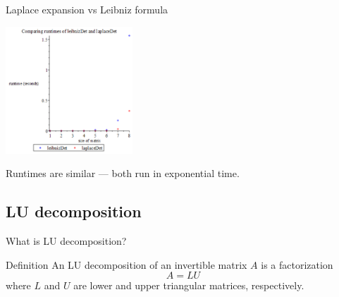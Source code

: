 \documentclass{beamer}
\begin{document}
\begin{frame}{Laplace expansion vs Leibniz formula}

    \begin{center}{}
        \includegraphics[height=180]{leibniz-laplace}
    \end{center}

    Runtimes are similar --- both run in exponential time.

\end{frame}

\subsection{LU decomposition}

\begin{frame}{What is LU decomposition?}

    \begin{block}{Definition}
        An LU decomposition of an invertible matrix $A$ is a factorization
        \[
            A = L U
        \]
        where $L$ and $U$ are lower and upper triangular matrices, respectively.
    \end{block}

\end{frame}
\end{document}
